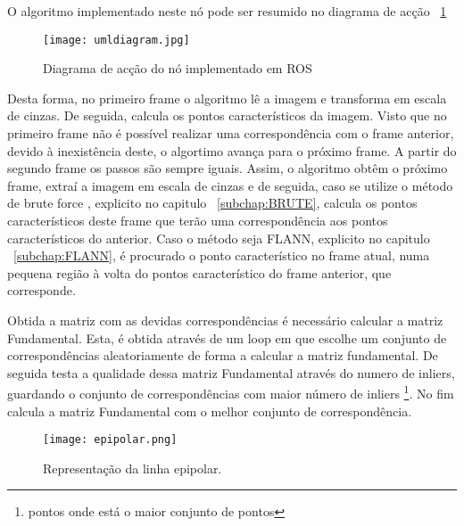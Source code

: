 	O algoritmo implementado neste nó pode ser resumido no diagrama de acção ~\ref{fig:diaguml}

	\begin{figure}[h!] %
		\begin{center}
			\leavevmode		
			\texttt{[image: umldiagram.jpg]}
			\caption{Diagrama de acção do nó implementado em ROS}
			\label{fig:diaguml}
		\end{center}
	\end{figure}


	
	Desta forma, no primeiro frame o algoritmo lê a imagem e transforma em escala de cinzas. De seguida, calcula os pontos característicos da imagem. Visto que no primeiro frame não é possível realizar uma correspondência com o frame anterior, devido à inexistência deste, o algortimo avança para o próximo frame. A partir do segundo frame os passos são sempre iguais. Assim, o algoritmo obtêm o próximo frame, extraí a imagem em escala de cinzas e de seguida, caso se utilize o método de brute force , explicito no capitulo ~\ref{subchap:BRUTE}, calcula os pontos característicos deste frame que terão uma correspondência aos pontos característicos do anterior. Caso o método seja FLANN, explicito no capitulo ~\ref{subchap:FLANN}, é procurado o ponto característico no frame atual, numa pequena região à volta do pontos característico do frame anterior, que corresponde.
	
	Obtida a matriz com as devidas correspondências é necessário calcular a matriz Fundamental. Esta, é obtida através de um loop em que escolhe um conjunto de correspondências aleatoriamente de forma a calcular a matriz fundamental. De seguida testa a qualidade dessa matriz Fundamental através do numero de inliers, guardando o conjunto de correspondências com maior número de inliers \footnote{pontos onde está o maior conjunto de pontos}. No fim calcula a matriz Fundamental com o melhor conjunto de correspondência.
	
	
	\begin{figure}[h!] %
		\begin{center}
			\leavevmode		
			\texttt{[image: epipolar.png]}
			\caption{Representação da linha epipolar.}
			\label{fig:equ}
		\end{center}
	\end{figure}

